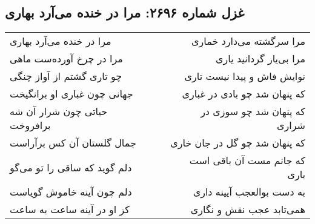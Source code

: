 \begin{center}
\section*{غزل شماره ۲۶۹۶: مرا در خنده می‌آرد بهاری}
\label{sec:2696}
\begin{longtable}{l p{0.5cm} r}
مرا در خنده می‌آرد بهاری
&&
مرا سرگشته می‌دارد خماری
\\
مرا در چرخ آورده‌ست ماهی
&&
مرا بی‌یار گردانید یاری
\\
چو تاری گشتم از آواز چنگی
&&
نوایش فاش و پیدا نیست تاری
\\
جهانی چون غباری او برانگیخت
&&
که پنهان شد چو بادی در غباری
\\
حیاتی چون شرار آن شه برافروخت
&&
که پنهان شد چو سوزی در شراری
\\
جمال گلستان آن کس برآراست
&&
که پنهان شد چو گل در جان خاری
\\
دلم گوید که ساقی را تو می‌گو
&&
که جانم مست آن باقی است باری
\\
دلم چون آینه خاموش گویاست
&&
به دست بوالعجب آیینه داری
\\
کز او در آینه ساعت به ساعت
&&
همی‌تابد عجب نقش و نگاری
\\
\end{longtable}
\end{center}
